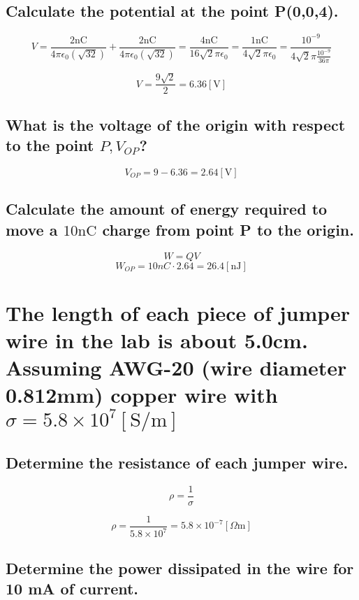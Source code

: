 \documentclass[14pt]{extarticle}
\begin{document}
\boldmath
\subsection{Calculate the potential at the point P(0,0,4).}
\unboldmath

$$V=\frac{2\mathrm{nC}}{4\pi\epsilon_0(\sqrt{32})}+\frac{2\mathrm{nC}}{4\pi\epsilon_0(\sqrt{32})}=\frac{4\mathrm{nC}}{16\sqrt{2}\pi\epsilon_0}=
	\frac{1\mathrm{nC}}{4\sqrt{2}\pi\epsilon_0}=\frac{10^{-9}}{4\sqrt{2}\pi\frac{10^{-9}}{36\pi}}$$

$$V=\frac{9\sqrt{2}}{2}=6.36[\mathrm{V}]$$

\boldmath
\subsection{What is the voltage of the origin with respect to the point $P,V_{OP}$?}
\unboldmath

$$V_{OP}=9-6.36=2.64[\mathrm{V}]$$

\boldmath
\subsection{Calculate the amount of energy required to move a $10\mathrm{nC}$ charge from point P to the origin.}
\unboldmath

$$W=QV$$
$$W_{OP}=10nC\cdot 2.64=26.4[\mathrm{nJ}]$$

\boldmath
\section{The length of each piece of jumper wire in the lab
  is about 5.0cm. Assuming AWG-20 (wire diameter
  0.812mm) copper wire with $\sigma=5.8\times10^7\left[\mathrm{S/m}\right]$}
\unboldmath

\boldmath
\subsection{Determine the resistance of each jumper wire.}
\unboldmath

$$\rho = \frac{1}{\sigma}$$

$$\rho = \frac{1}{5.8\times10^7}=5.8\times10^{-7}[\Omega\mathrm{m}]$$

\boldmath
\subsection{Determine the power dissipated in the wire for 10 mA of current.}
\unboldmath
\end{document}
